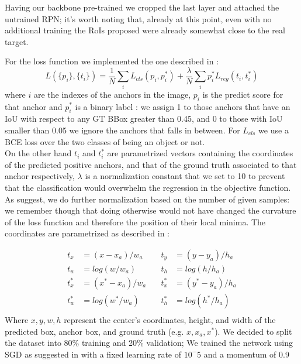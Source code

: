 \documentclass[10pt,journal,cspaper,compsoc]{IEEEtran}
\begin{document}
	Having our backbone pre-trained we cropped the last layer and attached the untrained RPN; it's worth noting that, already at this point, even with no additional training the RoIs proposed were already somewhat close to the real target. 

    For the loss function we implemented the one described in \cite{arxiv:FasterRCNN}:
	\begin{equation}\label{eq:loss}
        L(\{p_i\}, \{t_i\}) = \frac{1}{N}\sum_i  L_{cls}(p_i, p_i^*) +\frac{\lambda}{N} \sum_i p_i^* L_{reg}(t_i, t_i^*)
    \end{equation}
	where $i$ are the indexes of the anchors in the image, $p_i$ is the predict score for that anchor and $p_i^*$ is a binary label : we assign 1 to those anchors that have an IoU with respect to any GT BBox greater than 0.45, and 0 to those with IoU smaller than 0.05 we ignore the anchors that falls in between. For $L_{cls}$  we use a BCE loss over the two classes of being an object or not. \\On the other hand $t_i$ and $t_i^*$ are parametrized vectors containing the coordinates of the predicted positive anchors, and that of the ground truth associated to that anchor respectively, $\lambda$ is a normalization constant that we set to 10 to prevent that the classification would overwhelm the regression in the objective function. As \cite{arxiv:FastRCNN} suggest, we do further normalization based on the number of given samples: we remember though that doing otherwise would not have changed the curvature of the loss function and therefore the position of their local minima.
    The coordinates are parametrized as described in \cite{arxiv:FasterRCNN} : 

\begin{equation}\label{eq:reg_transf}
\begin{aligned}
t_x &= (x - x_a)/w_a \quad  &t_y &=(y - y_a)/h_a \\
t_w &= log(w/w_a) \quad &t_h &= log (h/h_a) \\
t_x^* &= (x^* - x_a)/w_a \quad &t_x^* &= (y^* - y_a)/h_a \\
t_w^* &= log(w^*/w_a) \quad  &t_h^*  &= log(h^*/h_a) \\
\end{aligned}
\end{equation}
Where $x,y,w,h$ represent the center's coordinates, height, and width of the predicted box, anchor box, and ground truth (e.g. $x, x_a, x^*$). 
We decided to split the dataset into 80\% training and 20\% validation; We trained the network using SGD as suggested in \cite{arxiv:FasterRCNN} with a fixed learning rate of $10^-5$ and a momentum of $0.9$
    
\end{document}
